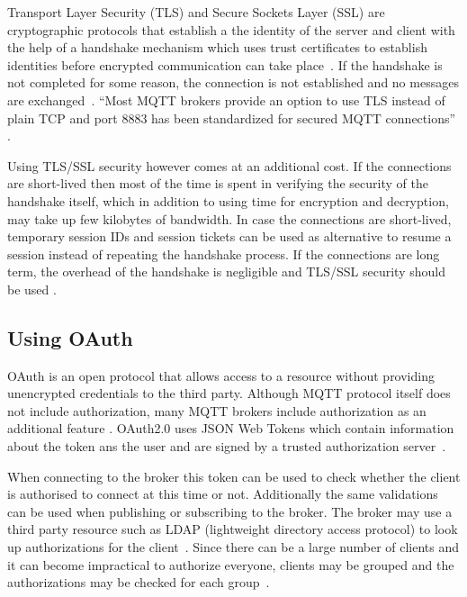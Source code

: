 Transport Layer Security (TLS) and Secure Sockets Layer (SSL) are
cryptographic protocols that establish a the identity of the server
and client with the help of a handshake mechanism which uses trust
certificates to establish identities before encrypted communication
can take place~\cite{ibm-mqtt-security}. If the handshake is not
completed for some reason, the connection is not established and no
messages are exchanged~\cite{mqtt-sec-ssl}. ``Most MQTT brokers
provide an option to use TLS instead of plain TCP and port 8883 has
been standardized for secured MQTT connections''
\cite{iot-design-mqtt-security}.

Using TLS/SSL security however comes at an additional cost. If the
connections are short-lived then most of the time is spent in
verifying the security of the handshake itself, which in addition to
using time for encryption and decryption, may take up few
kilobytes of bandwidth. In case the connections are short-lived,
temporary session IDs and session tickets can be used as alternative to resume a
session instead of repeating the handshake process. If the connections
are long term, the overhead of the handshake is negligible and TLS/SSL
security should be used
\cite{iot-design-mqtt-security,mqtt-sec-ssl}.

\subsection{Using OAuth}

OAuth is an open protocol that allows access to a resource without
providing unencrypted credentials to the third party. Although MQTT
protocol itself does not include authorization, many MQTT brokers
include authorization as an additional feature
\cite{ibm-mqtt-security}. OAuth2.0 uses JSON Web Tokens which contain
information about the token ans the user and are signed by a trusted
authorization server~\cite{hivemq-security-oauth}.

When connecting to the broker this token can be used to check whether
the client is authorised to connect at this time or not. Additionally
the same validations can be used when publishing or subscribing to the
broker. The broker may use a third party resource such as LDAP
(lightweight directory access protocol) to look up authorizations for
the client~\cite{hivemq-security-oauth}. Since there can be a large
number of clients and it can become impractical to authorize everyone,
clients may be grouped and the authorizations may be checked for each
group~\cite{ibm-mqtt-security}.
  
